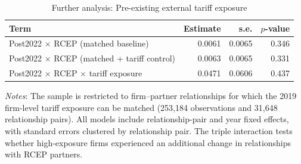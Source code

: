 \begin{table}[H]
\centering
\caption{Further analysis: Pre-existing external tariff exposure}
\label{tab:tariffalternative}
\small
\begin{threeparttable}
\begin{tabular}{lrrr}
\toprule
Term & Estimate & s.e. & $p$-value \\
\midrule
Post2022 $\times$ RCEP (matched baseline) & 0.0061 & 0.0065 & 0.346 \\
Post2022 $\times$ RCEP (matched + tariff control) & 0.0063 & 0.0065 & 0.331 \\
Post2022 $\times$ RCEP $\times$ tariff exposure & 0.0471 & 0.0606 & 0.437 \\
\bottomrule
\end{tabular}
\begin{tablenotes}[flushleft]
\item
\footnotesize \textit{Notes}: The sample is restricted to firm--partner relationships for which the 2019 firm-level tariff exposure can be matched (253,184 observations and 31,648 relationship pairs). All models include relationship-pair and year fixed effects, with standard errors clustered by relationship pair. The triple interaction tests whether high-exposure firms experienced an additional change in relationships with RCEP partners.
\end{tablenotes}
\end{threeparttable}
\end{table}
